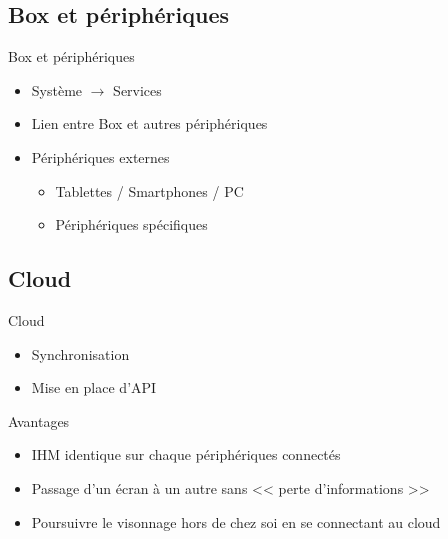 \documentclass{beamer}
\begin{document}
	\subsection{Box et périphériques}
	\begin{frame}{Box et périphériques}
		\begin{itemize}
			\item Système $\rightarrow$ Services
		\pause
			\item Lien entre Box et autres périphériques
		\pause
			\item Périphériques externes
				\begin{itemize}
					\item Tablettes / Smartphones / PC
					\item Périphériques spécifiques
				\end{itemize}
		\end{itemize}
	\end{frame}
	\subsection{Cloud}
	\begin{frame}{Cloud}
		\begin{itemize}
			\item Synchronisation
		\pause
			\item Mise en place d'API
		\end{itemize}
		\begin{exampleblock}{Avantages}
			\begin{itemize}
				\item IHM identique sur chaque périphériques connectés
				\item Passage d'un écran à un autre sans << perte d'informations >>
				\item Poursuivre le visonnage hors de chez soi en se connectant au cloud
			\end{itemize}
		\end{exampleblock}
	\end{frame}
\end{document}
